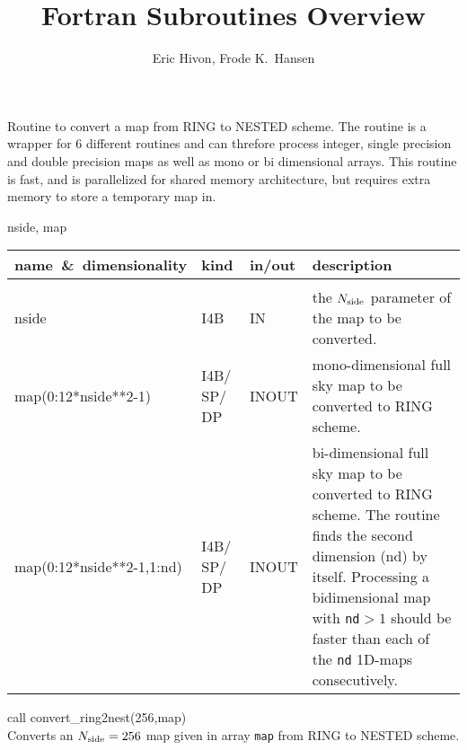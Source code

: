
\sloppy


\title{\healpix Fortran Subroutines Overview}
 \section[convert\_ring2nest*]{ }
\label{sub:convert_ring2nest}
\author{Eric Hivon, Frode K.~Hansen}


\begin{facility}
{Routine to convert a \healpix map from RING to NESTED scheme. \newline
The routine is a
  wrapper for 6 different routines and can threfore process
  integer, single precision and double precision maps as well as mono or bi
  dimensional arrays. \newline This routine is fast, and is parallelized for shared memory
architecture, but requires extra memory to store a temporary map in. }
{\modPixTools}
\end{facility}

\begin{f90format}
{nside, map}
\end{f90format}

\begin{arguments}
{
\begin{tabular}{p{0.4\hsize} p{0.05\hsize} p{0.1\hsize} p{0.35\hsize}} \hline  
\textbf{name~\&~dimensionality} & \textbf{kind} & \textbf{in/out} & \textbf{description} \\ \hline
                   &   &   &                           \\ %
nside & I4B & IN & the ${N_{\rm side}}$ parameter of the map to be converted. \\
map(0:12*nside**2-1) & I4B/ SP/ DP & INOUT & mono-dimensional full sky map to be converted to RING scheme. \\
map(0:12*nside**2-1,1:nd) & I4B/ SP/ DP & INOUT & bi-dimensional full sky map to
                   be converted to RING scheme. The routine finds the second
                   dimension (nd) by itself. Processing a bidimensional map with
{\tt nd}$>1$ should be
                   faster than each of the {\tt nd} 1D-maps consecutively.
\end{tabular}
}
\end{arguments}

\begin{example}
{
call convert\_ring2nest(256,map)  \\
}
{
Converts an ${N_{\rm side}}=256$ map given in array {\tt map} from RING to NESTED scheme.
}
\end{example}

